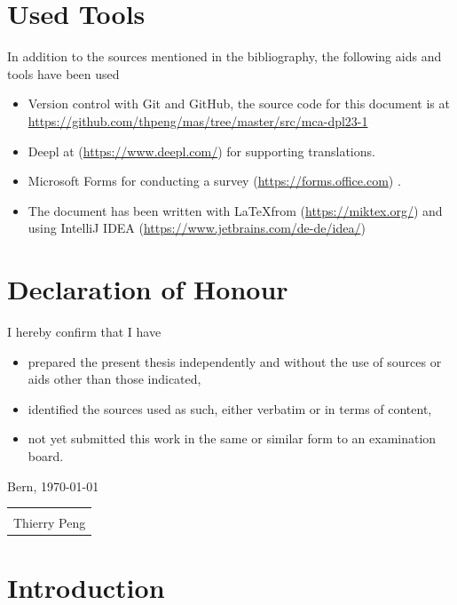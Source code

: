 \documentclass[a4paper,12pt]{article}
\begin{document}
    \section*{Used Tools}
    In addition to the sources mentioned in the bibliography, the following aids and tools have been used
    \begin{itemize}
        \item Version control with Git and GitHub, the source code for this document is at \url{https://github.com/thpeng/mas/tree/master/src/mca-dpl23-1}
        \item Deepl at (\url{https://www.deepl.com/}) for supporting translations.
        \item Microsoft Forms for conducting a survey (\url{https://forms.office.com}) .
        \item The document has been written with \LaTeX from (\url{https://miktex.org/}) and using IntelliJ IDEA (\url{https://www.jetbrains.com/de-de/idea/})
    \end{itemize}

    \section*{Declaration of Honour}

    I hereby confirm that I have
    \begin{itemize}
        \item prepared the present thesis independently and without the use of sources or aids other than those indicated,
        \item identified the sources used as such, either verbatim or in terms of content,
        \item not yet submitted this work in the same or similar form to an examination board.
    \end{itemize}
    Bern, \today\newline
    \newline
    \newline
    \newline
    \begin{tabular}{@{}p{5.0cm}@{}}
        \hrulefill \\
        Thierry Peng
    \end{tabular}

    \pagebreak


    \section{Introduction}
    \label{sec:introduction}
\end{document}

